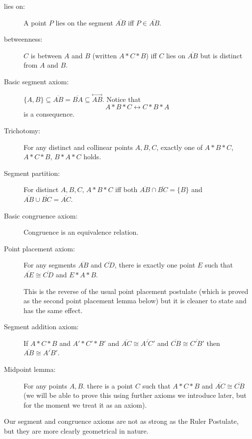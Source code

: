 \documentclass[12pt]{article}
\newcommand\Line[1]{\overset{\leftrightarrow}{#1}}
\begin{document}
\begin{description}

\item[lies on:]  A point $P$ lies on the segment $\overline{AB}$ iff $P \in \overline{AB}$.

\item[betweenness:]  $C$ is between $A$ and $B$ (written $A*C*B$) iff $C$ lies on $\overline{AB}$ but is distinct from $A$ and $B$.

\item[Basic segment axiom:]  $\{A,B\} \subseteq \overline{AB} =\overline{BA} \subseteq \Line{AB}$.  Notice that $$A*B*C \leftrightarrow C*B*A$$ is a consequence.

\item[Trichotomy:]  For any distinct and collinear points $A,B,C$, exactly one of $A*B*C$, $A*C*B$, $B*A*C$ holds.

\item[Segment partition:]  For distinct $A,B,C$, $A*B*C$ iff both $\overline{AB} \cap \overline{BC} = \{B\}$ and $\overline{AB} \cup \overline{BC} = \overline{AC}$.

\item[Basic congruence axiom:]  Congruence is an equivalence relation.

\item[Point placement axiom:]  For any segments $\overline{AB}$ and $\overline{CD}$, there is exactly one point $E$ such that $\overline{AE} \cong \overline{CD}$ and $E*A*B$.

This is the reverse of the usual point placement postulate (which is proved as the second point placement lemma below) but it is cleaner to state and has the same effect.

\item[Segment addition axiom:]  If $A*C*B$ and $A'*C'*B'$ and $\overline{AC} \cong \overline{A'C'}$ and $\overline{CB} \cong \overline{C'B'}$ then $\overline{AB} \cong \overline{A'B'}$. 

\item[Midpoint lemma:]  For any points $A,B$. there is a point $C$ such that $A*C*B$ and $\overline{AC} \cong \overline{CB}$ (we will be able to prove this using further axioms we introduce later, but for the moment we treat it as an axiom).


\end{description}

Our segment and congruence axioms are not as strong as the Ruler Postulate, but they are more clearly geometrical in nature.
\end{document}
